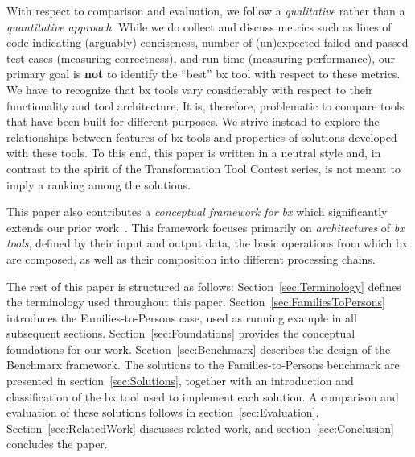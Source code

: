 With respect to comparison and evaluation, we follow a \emph{qualitative} rather than a \emph{quantitative approach}. 
While we do collect and discuss metrics such as lines of code indicating (arguably) conciseness, number of (un)expected failed and passed test cases (measuring correctness), and run time (measuring performance), our primary goal is \textbf{not} to identify the ``best'' bx tool with respect to these metrics. 
We have to recognize that bx tools vary considerably with respect to their functionality and tool architecture. 
It is, therefore, problematic to compare tools that have been built for different purposes. 
We strive instead to explore the relationships between features of bx tools and properties of solutions developed with these tools. 
%
To this end, this paper is written in a neutral style and, in contrast to the spirit of the Transformation Tool Contest series, is not meant to imply a ranking among the solutions. 

This paper also contributes a \emph{conceptual framework for bx} which significantly extends our prior work~\cite{Anjorin2017}. 
This framework focuses primarily on \emph{architectures} of \emph{bx tools}, defined by their input and output data, the basic operations from which bx are composed, as well as their composition into different processing chains.  

The rest of this paper is structured as follows: Section~\ref{sec:Terminology} defines the terminology used throughout this paper. Section~\ref{sec:FamiliesToPersons} introduces the Families-to-Persons case, used as running example in all subsequent sections. 
Section~\ref{sec:Foundations} provides the conceptual foundations for our work. 
Section~\ref{sec:Benchmarx} describes the design of the Benchmarx framework. 
The solutions to the Families-to-Persons benchmark are presented in section~\ref{sec:Solutions}, together with an introduction and classification of the bx tool used to implement each solution. 
A comparison and evaluation of these solutions follows in section~\ref{sec:Evaluation}. 
Section~\ref{sec:RelatedWork} discusses related work, and section~\ref{sec:Conclusion} concludes the paper.